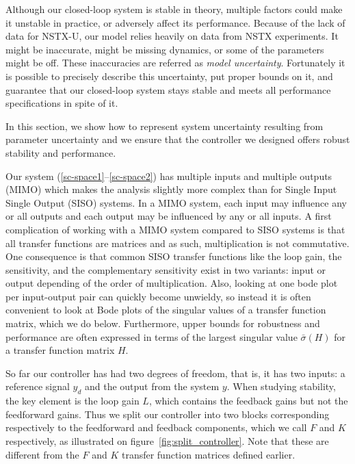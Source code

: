 \documentclass[12pt,lot, lof]{puthesis}
\begin{document}
Although our closed-loop system is stable in theory, multiple factors could make it unstable in practice, or adversely affect its performance.
Because of the lack of data for NSTX-U, our model relies heavily on data from NSTX experiments.
It might be inaccurate, might be missing dynamics, or some of the parameters might be off.
These inaccuracies are referred as \emph{model uncertainty}.
Fortunately it is possible to precisely describe this uncertainty, put proper bounds on it, and guarantee that our closed-loop system stays stable and meets all performance specifications in spite of it.

In this section, we show how to represent system uncertainty resulting from parameter uncertainty and we ensure that the controller we designed offers robust stability and performance.

Our system (\ref{sc-space1}--\ref{sc-space2}) has multiple inputs and multiple outputs (MIMO) which makes the analysis slightly more complex than for Single Input Single Output (SISO) systems. In a MIMO system, each input may influence any or all outputs and each output may be influenced by any or all inputs.
A first complication of working with a MIMO system compared to SISO systems is that all transfer functions are matrices and as such, multiplication is not commutative.
One consequence is that common SISO transfer functions like the loop gain, the sensitivity, and the complementary sensitivity exist in two variants: input or output depending of the order of multiplication.
Also, looking at one bode plot per input-output pair can quickly become unwieldy, so instead it is often convenient to look at Bode plots of the singular values of a transfer function matrix, which we do below.
Furthermore, upper bounds for robustness and performance are often expressed in terms of the largest singular value $\bar\sigma(H)$ for a transfer function matrix $H$.

So far our controller has had two degrees of freedom, that is, it has two inputs:
a reference signal $y_d$ and the output from the system $y$.
When studying stability, the key element is the loop gain $L$, which contains the feedback gains but not the feedforward gains.
Thus we split our controller into two blocks corresponding respectively to the feedforward and feedback components,
which we call $F$ and $K$ respectively, as illustrated on figure~\ref{fig:split_controller}.
Note that these are different from the $F$ and $K$ transfer function matrices defined earlier.
\end{document}

